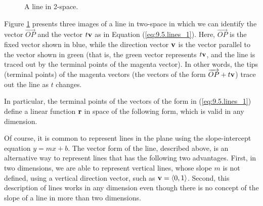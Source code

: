 \begin{figure}[ht]
\begin{center}
\caption{A line in 2-space.}
\label{F:9.5.Line_2D}
\end{center}
\end{figure}


Figure \ref{F:9.5.Line_2D} presents three images of a line in two-space in which we can identify the vector
$\overrightarrow{OP}$ and the vector $t \mathbf{v}$ as in Equation
(\ref{eq:9.5.lines_1}).  Here, $\overrightarrow{OP}$ is the fixed
vector shown in blue, while the direction vector $\mathbf{v}$ is the vector
parallel to the vector shown in green (that is, the green vector
represents $t\mathbf{v}$, and the line is traced out by the terminal points
of the magenta vector). In other words, the tips (terminal points) of the magenta vectors (the vectors of the form $\overrightarrow{OP} + t\mathbf{v}$) trace out the line as $t$ changes. 
%

In particular, the terminal points of the vectors of the form in
(\ref{eq:9.5.lines_1}) define a linear function $\mathbf{r}$ in space of the
following form, which is valid in any dimension.

\vspace*{5pt}
\nin {}
\vspace*{5pt}

Of course, it is common to
represent lines in the plane using the slope-intercept equation $y=mx
+ b$.  The vector form of the line, described above, is an
alternative way to represent lines that has the following two
advantages.  First, in two dimensions, we are able to represent
vertical lines, whose slope $m$ is not defined, using a vertical
direction vector, such as $\mathbf{v}=\langle 0, 1\rangle$.  Second, this
description of lines works in any dimension even though
there is no concept of the slope of a line in more than two dimensions.

